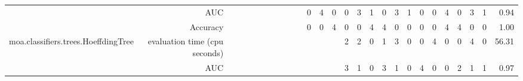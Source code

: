 \documentclass{article}
\providecommand{\tabularnewline}{\\}
\begin{document}
\begin{sidewaystable}
\begin{tabular}{|r|r|rrrrrrrr|r|r|r|r|r|r|r|r|r|r|r|r|r|r|r|r|r|}
 \cline{2-2} \cline{12-27}
 & AUC & \multicolumn{1}{r}{} & \multicolumn{1}{r}{} & \multicolumn{1}{r}{} & \multicolumn{1}{r}{} & \multicolumn{1}{r}{} & \multicolumn{1}{r}{} & \multicolumn{1}{r}{} & \multicolumn{1}{r}{} & \multicolumn{1}{r|}{} & \multicolumn{1}{r|}{0} & \multicolumn{1}{r|}{4} & \multicolumn{1}{r|}{0} & \multicolumn{1}{r|}{0} & \multicolumn{1}{r|}{3} & \multicolumn{1}{r|}{1} & \multicolumn{1}{r|}{0} & \multicolumn{1}{r|}{3} & \multicolumn{1}{r|}{1} & \multicolumn{1}{r|}{0} & \multicolumn{1}{r|}{0} & \multicolumn{1}{r|}{4} & \multicolumn{1}{r|}{0} & \multicolumn{1}{r|}{3} & \multicolumn{1}{r|}{1} & 0.94\tabularnewline
 \cline{2-2} \cline{12-27}
 & Accuracy & \multicolumn{1}{r}{} & \multicolumn{1}{r}{} & \multicolumn{1}{r}{} & \multicolumn{1}{r}{} & \multicolumn{1}{r}{} & \multicolumn{1}{r}{} & \multicolumn{1}{r}{} & \multicolumn{1}{r}{} & \multicolumn{1}{r|}{} & \multicolumn{1}{r|}{0} & \multicolumn{1}{r|}{0} & \multicolumn{1}{r|}{4} & \multicolumn{1}{r|}{0} & \multicolumn{1}{r|}{0} & \multicolumn{1}{r|}{4} & \multicolumn{1}{r|}{4} & \multicolumn{1}{r|}{0} & \multicolumn{1}{r|}{0} & \multicolumn{1}{r|}{0} & \multicolumn{1}{r|}{0} & \multicolumn{1}{r|}{4} & \multicolumn{1}{r|}{4} & \multicolumn{1}{r|}{0} & \multicolumn{1}{r|}{0} & 1.00\tabularnewline
 \cline{1-2} \cline{12-27}
\multirow{3}{*}{moa.classifiers.trees.HoeffdingTree} & evaluation time (cpu seconds) & \multicolumn{1}{r}{} & \multicolumn{1}{r}{} & \multicolumn{1}{r}{} & \multicolumn{1}{r}{} & \multicolumn{1}{r}{} & \multicolumn{1}{r}{} & \multicolumn{1}{r}{} & \multicolumn{1}{r}{} & \multicolumn{1}{r}{} & \multicolumn{1}{r}{} & \multicolumn{1}{r}{} & \multicolumn{1}{r|}{} & \multicolumn{1}{r|}{2} & \multicolumn{1}{r|}{2} & \multicolumn{1}{r|}{0} & \multicolumn{1}{r|}{1} & \multicolumn{1}{r|}{3} & \multicolumn{1}{r|}{0} & \multicolumn{1}{r|}{0} & \multicolumn{1}{r|}{4} & \multicolumn{1}{r|}{0} & \multicolumn{1}{r|}{0} & \multicolumn{1}{r|}{4} & \multicolumn{1}{r|}{0} & 56.31\tabularnewline
 \cline{2-2} \cline{15-27}
 & AUC & \multicolumn{1}{r}{} & \multicolumn{1}{r}{} & \multicolumn{1}{r}{} & \multicolumn{1}{r}{} & \multicolumn{1}{r}{} & \multicolumn{1}{r}{} & \multicolumn{1}{r}{} & \multicolumn{1}{r}{} & \multicolumn{1}{r}{} & \multicolumn{1}{r}{} & \multicolumn{1}{r}{} & \multicolumn{1}{r|}{} & \multicolumn{1}{r|}{3} & \multicolumn{1}{r|}{1} & \multicolumn{1}{r|}{0} & \multicolumn{1}{r|}{3} & \multicolumn{1}{r|}{1} & \multicolumn{1}{r|}{0} & \multicolumn{1}{r|}{4} & \multicolumn{1}{r|}{0} & \multicolumn{1}{r|}{0} & \multicolumn{1}{r|}{2} & \multicolumn{1}{r|}{1} & \multicolumn{1}{r|}{1} & 0.97\tabularnewline

\end{tabular}
\end{sidewaystable}
\end{document}

